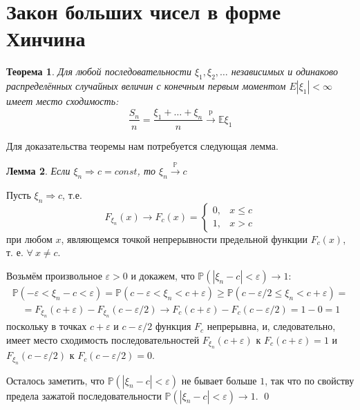\documentclass[oneside,final,14pt]{extreport}
\renewenvironment{proof}{{\bfseries Доказательство.}}{\qed}
\newtheorem{thm}{Теорема}[section]
\newtheorem{lem}[thm]{Лемма}
\theoremstyle{definition}
\begin{document}
\section{Закон больших чисел в форме Хинчина}
\begin{thm}
    Для любой последовательности $\xi_{1}, \xi_{2}, \ldots$ независимых и одинаково распределённых случайных величин с конечным первым моментом $E\left|\xi_{1}\right|<\infty$ имеет место сходимость:
    \begin{equation*}
        \frac{S_{n}}{n} = \frac{\xi_{1}+\ldots+\xi_{n}}{n} \xrightarrow[]{\text{p}} \mathbb{E} \xi_{1}
    \end{equation*}
\end{thm}
Для доказательства теоремы нам потребуется следующая лемма.
\begin{lem}
    Если $\xi_{n} \Rightarrow c=const$, то $\xi_{n} \stackrel{\mathbb{P}}{\longrightarrow} c$
\end{lem}
\begin{proof}
    Пусть $\xi_{n} \Rightarrow c$, т.е.
    \begin{equation*}
        F_{\xi_{n}}(x) \rightarrow F_{c}(x)=\left\{\begin{array}{ll}
        0, & x \leqslant c \\
        1, & x>c
        \end{array}\right.
    \end{equation*}
    при любом $x$, являющемся точкой непрерывности предельной функции $F_{c}(x)$, т. е. $\forall~ x \neq c$.
    
    Возьмём произвольное $\varepsilon>0$ и докажем, что $\mathbb{P}\left(\left|\xi_{n}-c\right|<\varepsilon\right) \rightarrow 1$:
    \begin{multline*}
        \mathbb{P}\left(-\varepsilon<\xi_{n}-c<\varepsilon\right)=\mathbb{P}\left(c-\varepsilon<\xi_{n}<c+\varepsilon\right) \geqslant \mathbb{P}\left(c-\varepsilon / 2 \leqslant \xi_{n}<c+\varepsilon\right)= \\
        \quad=F_{\xi_{n}}(c+\varepsilon)-F_{\xi_{n}}(c-\varepsilon / 2) \rightarrow F_{c}(c+\varepsilon)-F_{c}(c-\varepsilon / 2)=1-0=1
    \end{multline*}
    поскольку в точках $c+\varepsilon$ и $c-\varepsilon / 2$ функция $F_{c}$ непрерывна, и, следовательно, имеет место сходимость последовательностей $F_{\xi_{n}}(c+\varepsilon)$ к $F_{c}(c+\varepsilon)=1$ и $F_{\xi_{n}}(c-\varepsilon / 2)$ к $F_{c}(c-\varepsilon / 2)=0$.
    
    Осталось заметить, что $\mathbb{P}\left(\left|\xi_{n}-c\right|<\varepsilon\right)$ не бывает больше $1$, так что по свойству предела зажатой последовательности $\mathbb{P}\left(\left|\xi_{n}-c\right|<\varepsilon\right) \rightarrow 1$.
\end{proof}
\end{document}
